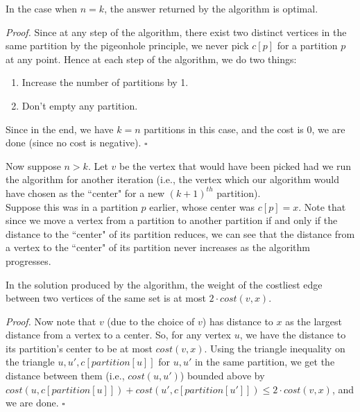 \documentclass[a4paper]{article}
\newenvironment{proof}{\begin{breakbox}\textit{Proof.}}{\hfill$\square$\end{breakbox}}
\newcommand{\nl}{\vspace{0.2cm}\\}
\begin{document}
\begin{claim}
In the case when $n = k$, the answer returned by the algorithm is optimal.
\end{claim}
\begin{proof}
    Since at any step of the algorithm, there exist two distinct vertices in the same partition by the pigeonhole principle, we never pick $c[p]$ for a partition $p$ at any point. Hence at each
    step of the algorithm, we do two things:
    \begin{enumerate}
        \item Increase the number of partitions by 1.
        \item Don't empty any partition.
    \end{enumerate}
    Since in the end, we have $k = n$ partitions in this case, and the cost is $0$, we are done (since no cost is negative).
\end{proof}

Now suppose $n > k$. Let $v$ be the vertex that would have been picked had we run the algorithm for another iteration (i.e., the vertex which our algorithm would have chosen as the ``center" for a
new $(k + 1)^{th}$ partition).\nl
Suppose this was in a partition $p$ earlier, whose center was $c[p] = x$. Note that since we move a vertex from a partition to another partition if and only if the distance to the
``center" of its partition reduces, we can see that the distance from a vertex to the ``center" of its partition never increases as the algorithm progresses.\nl
\begin{claim}
    In the solution produced by the algorithm, the weight of the costliest edge between two vertices of the same set is at most $2 \cdot cost(v, x)$.
\end{claim}
\begin{proof}
Now note that $v$ (due to the choice of $v$) has distance to $x$ as the largest distance from a vertex to a center. So, for any vertex $u$, we have the distance to its partition's center to be at most
$cost(v, x)$. Using the triangle inequality on the triangle $u, u', c[partition[u]]$ for $u, u'$ in the same partition, we get the distance between them (i.e., $cost(u, u')$) bounded above by
$cost(u, c[partition[u]]) + cost(u', c[partition[u']]) \le 2\cdot cost(v, x)$, and we are done.
\end{proof}
\end{document}
